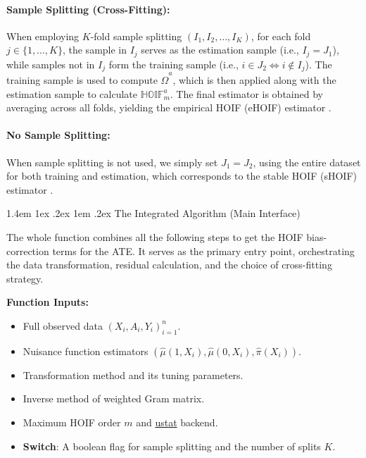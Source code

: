 \documentclass[12pt]{article}
\makeatletter
\renewcommand{\section}{\@startsection{section}{1}{\z@}%
  {1.4em \@plus 1ex \@minus .2ex}%
  {1em \@plus .2ex}%
  {\normalfont\Large\bfseries}}
\newcommand{\ustat}{\href{https://github.com/cxy0714/U-Statistics-R}{\textrm{ustat}}}
\makeatother
\begin{document}
\paragraph{Sample Splitting (Cross-Fitting):}
When employing $K$-fold sample splitting $(I_1,I_2,\ldots, I_K)$, for each fold $j \in \{1, \ldots, K\}$, the sample in $I_j$ serves as the estimation sample (i.e., $I_j = J_1$), while samples not in $I_j$ form the training sample (i.e., $i \in J_2 \Leftrightarrow i \notin I_j$). The training sample is used to compute $\hat{\Omega}^a$, which is then applied along with the estimation sample to calculate $\mathbb{HOIF}^a_m$. The final estimator is obtained by averaging across all folds, yielding the empirical HOIF (eHOIF) estimator \cite{liu2017semiparametric}.

\paragraph{No Sample Splitting:}
When sample splitting is not used, we simply set $J_1 = J_2$, using the entire dataset for both training and estimation, which corresponds to the stable HOIF (sHOIF) estimator \cite{LiuLi2023_sHOIF}.


\section{The Integrated Algorithm (Main Interface)}

The whole function combines all the following steps to get the HOIF bias-correction terms for the ATE. It serves as the primary entry point, orchestrating the data transformation, residual calculation, and the choice of cross-fitting strategy.

\textbf{Function Inputs:}
\begin{itemize}
  \item Full observed data $(X_i, A_i, Y_i)_{i=1}^n$.
  \item Nuisance function estimators $(\hat{\mu}(1, X_i), \hat{\mu}(0, X_i), \hat{\pi}(X_i))$.
  \item Transformation method and its tuning parameters.
  \item Inverse method of weighted Gram matrix.
  \item Maximum HOIF order $m$ and \ustat{} backend.
  \item \textbf{Switch}: A boolean flag for sample splitting and the number of splits $K$.
\end{itemize}
\end{document}
